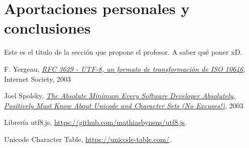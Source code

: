 \documentclass{article}
\begin{document}
\section{Aportaciones personales y conclusiones}
Este es el título de la sección que propone el profesor. A saber qué poner xD.

\begin{thebibliography}{9}
  F. Yergeau, \href{https://tools.ietf.org/html/rfc3629}{\textit{RFC 3629 -
      UTF-8, un formato de transformación de ISO 10646}}, Internet Society, 2003

  Joel Spolsky,
  \href{https://www.joelonsoftware.com/2003/10/08/the-absolute-minimum-every-software-developer-absolutely-positively-must-know-about-unicode-and-character-sets-no-excuses/}{\textit{The
      Absolute Minimum Every Software Developer Absolutely, Positively Must Know
      About Unicode and Character Sets (No Excuses!)}}, 2003

  Librería utf8.js,
  \href{https://github.com/mathiasbynens/utf8.js}{https://github.com/mathiasbynens/utf8.js}.

  Unicode Character Table,
  \href{https://unicode-table.com/}{https://unicode-table.com/}.

\end{thebibliography}
\end{document}
